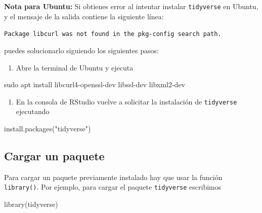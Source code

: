 \documentclass[
  title=normal,
  notoc,
  bib=normal]{mnye}
\newenvironment{Shaded}{\begin{snugshade}}{\end{snugshade}}
\newcommand{\FunctionTok}[1]{\textcolor[rgb]{0.00,0.00,0.00}{#1}}
\newcommand{\NormalTok}[1]{#1}
\newcommand{\StringTok}[1]{\textcolor[rgb]{0.31,0.60,0.02}{#1}}
\providecommand{\tightlist}{%
  \setlength{\itemsep}{0pt}\setlength{\parskip}{0pt}}
\begin{document}
\begin{infobox}

\textbf{Nota para Ubuntu:} Si obtienes error al intentar instalar \texttt{tidyverse} en Ubuntu, y el mensaje de la salida contiene la siguiente línea:

\texttt{Package\ libcurl\ was\ not\ found\ in\ the\ pkg-config\ search\ path.}

puedes solucionarlo siguiendo los siguientes pasos:

\begin{enumerate}
\def\labelenumi{\arabic{enumi}.}
\tightlist
\item
  Abre la terminal de Ubuntu y ejecuta
\end{enumerate}

\begin{Shaded}
\begin{Highlighting}[]
\FunctionTok{sudo}\NormalTok{ apt install libcurl4{-}openssl{-}dev libssl{-}dev libxml2{-}dev}
\end{Highlighting}
\end{Shaded}

\begin{enumerate}
\def\labelenumi{\arabic{enumi}.}
\setcounter{enumi}{1}
\tightlist
\item
  En la consola de \textsf{RStudio} vuelve a solicitar la instalación de \texttt{tidyverse} ejecutando
\end{enumerate}

\begin{Shaded}
\begin{Highlighting}[]
\FunctionTok{install.packages}\NormalTok{(}\StringTok{"tidyverse"}\NormalTok{)}
\end{Highlighting}
\end{Shaded}

\end{infobox}

\hypertarget{cargar-un-paquete}{%
\subsection{Cargar un paquete}\label{cargar-un-paquete}}

Para cargar un paquete previamente instalado hay que usar la función \texttt{library()}. Por ejemplo, para cargar el paquete \texttt{tidyverse} escribimos

\begin{Shaded}
\begin{Highlighting}[]
\FunctionTok{library}\NormalTok{(tidyverse)}
\end{Highlighting}
\end{Shaded}
\end{document}
